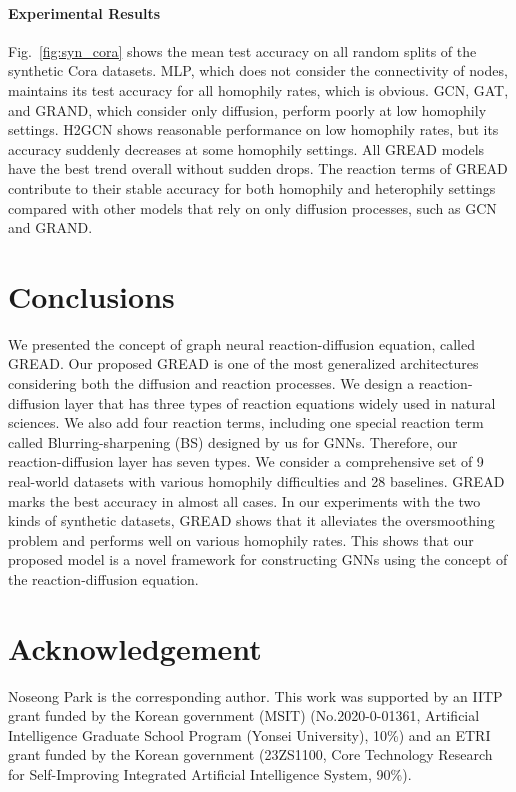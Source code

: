 \documentclass{article}
\theoremstyle{plain}
\theoremstyle{definition}
\theoremstyle{remark}
\begin{document}
\paragraph{Experimental Results} Fig.~\ref{fig:syn_cora} shows the mean test accuracy on all random splits of the synthetic Cora datasets. MLP, which does not consider the connectivity of nodes, maintains its test accuracy for all homophily rates, which is obvious. GCN, GAT, and GRAND, which consider only diffusion, perform poorly at low homophily settings. H2GCN shows reasonable performance on low homophily rates, but its accuracy suddenly decreases at some homophily settings. All GREAD models have the best trend overall without sudden drops. The reaction terms of GREAD contribute to their stable accuracy for both homophily and heterophily settings compared with other models that rely on only diffusion processes, such as GCN and GRAND.

\section{Conclusions}
We presented the concept of graph neural reaction-diffusion equation, called GREAD. Our proposed GREAD is one of the most generalized architectures considering both the diffusion and reaction processes. We design a reaction-diffusion layer that has three types of reaction equations widely used in natural sciences. We also add four reaction terms, including one special reaction term called Blurring-sharpening (BS) designed by us for GNNs. Therefore, our reaction-diffusion layer has seven types. We consider a comprehensive set of 9 real-world datasets with various homophily difficulties and 28 baselines. GREAD marks the best accuracy in almost all cases. In our experiments with the two kinds of synthetic datasets, GREAD shows that it alleviates the oversmoothing problem and performs well on various homophily rates. This shows that our proposed model is a novel framework for constructing GNNs using the concept of the reaction-diffusion equation.

\section*{Acknowledgement}
Noseong Park is the corresponding author. This work was supported by an IITP grant funded by the Korean government (MSIT) (No.2020-0-01361, Artificial Intelligence Graduate School Program (Yonsei University), 10\%) and an ETRI grant funded by the Korean government (23ZS1100, Core Technology Research for Self-Improving Integrated Artificial Intelligence System, 90\%).
\end{document}
